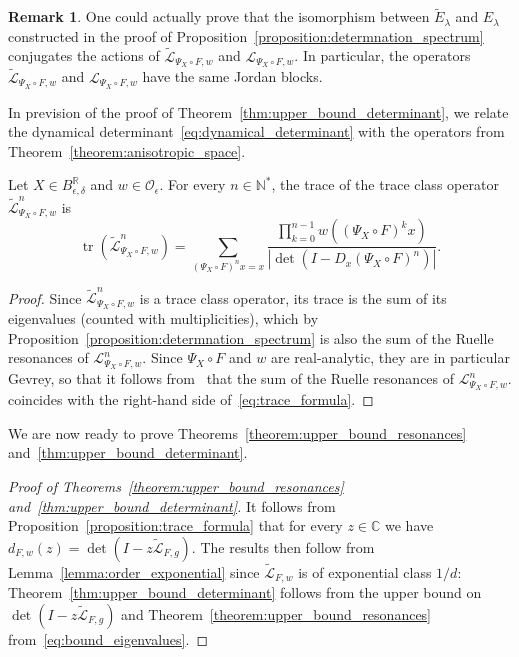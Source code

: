 \documentclass[10pt]{amsart}
\theoremstyle{definition}\newtheorem{defi}[theo]{Definition}\newtheorem{rema}[theo]{Remark}\newtheorem{exam}[theo]{Example}\newtheorem{exem}[theo]{Example}\newtheorem{nota}[theo]{Notation}
\DeclareMathOperator{\tr}{tr}
\newcommand{\p}[1]{\left(#1\right)}
\newcommand{\va}[1]{\left|#1\right|}
\newcommand{\clO}{\mathcal{O}}
\newcommand{\clL}{\mathcal{L}}
\newcommand{\bbC}{\mathbb{C}}
\newcommand{\bbN}{\mathbb{N}}
\newcommand{\bbR}{\mathbb{R}}
\newcommand*{\MK}{\mkern 2mu}
\begin{document}
\begin{rema}
One could actually prove that the isomorphism between $\widetilde{E}_\lambda$ and $E_\lambda$ constructed in the proof of Proposition~\ref{proposition:determnation_spectrum} conjugates the actions of $\widetilde{\clL}_{\Psi_X \circ F,w}$ and $\clL_{\Psi_X \circ F,w}$. In particular, the operators $\widetilde{\clL}_{\Psi_X \circ F,w}$ and $\clL_{\Psi_X \circ F,w}$ have the same Jordan blocks.
\end{rema}

In prevision of the proof of Theorem~\ref{thm:upper_bound_determinant}, we relate the dynamical determinant~\eqref{eq:dynamical_determinant} with the operators from Theorem~\ref{theorem:anisotropic_space}.

\begin{prop}\label{proposition:trace_formula}
Let $X \in B_{\epsilon,\delta}^{\bbR}$ and $w \in \clO_\epsilon$. For every $n \in \bbN^*$, the trace of the trace class operator $\widetilde{\clL}_{\Psi_X \circ F,w}^n$ is
\begin{equation}\label{eq:trace_formula}
\tr\p{\widetilde{\clL}_{\Psi_X \circ F,w}^n} = \sum_{\left(\Psi_X \circ F\right)^n x = x} \frac{\prod_{k = 0}^{n-1} w\left(\left(\Psi_X \circ F\right)^k x\right)}{\va{\det\p{ I - D_x (\Psi_X \circ F)^n}}}.
\end{equation}
\end{prop}

\begin{proof}
Since $\widetilde{\clL}_{\Psi_X \circ F,w}^n$ is a trace class operator, its trace is the sum of its eigenvalues (counted with multiplicities), which by Proposition~\ref{proposition:determnation_spectrum} is also the sum of the Ruelle resonances of $\clL_{\Psi_X \circ F,w}^n$. Since $\Psi_X \circ F$ and $w$ are real-analytic, they are in particular Gevrey, so that it follows from~\cite[Theorem~2.12$\MK$(iv)]{local_and_global} that the sum of the Ruelle resonances of $\clL_{\Psi_X \circ F,w}^n$. coincides with the right-hand side of~\eqref{eq:trace_formula}.
\end{proof}

We are now ready to prove Theorems~\ref{theorem:upper_bound_resonances} and~\ref{thm:upper_bound_determinant}.

\begin{proof}[Proof of Theorems~\ref{theorem:upper_bound_resonances} and~\ref{thm:upper_bound_determinant}]
It follows from Proposition~\ref{proposition:trace_formula} that for every $z \in \bbC$ we have $d_{F,w}(z) = \det(I - z \widetilde{\clL}_{F,g})$. The results then follow from Lemma~\ref{lemma:order_exponential} since $\widetilde{\clL}_{F,w}$ is of exponential class $1/d$: Theorem~\ref{thm:upper_bound_determinant} follows from the upper bound on $\det(I - z \widetilde{\clL}_{F,g})$ and Theorem~\ref{theorem:upper_bound_resonances} from~\eqref{eq:bound_eigenvalues}.
\end{proof}
\end{document}
